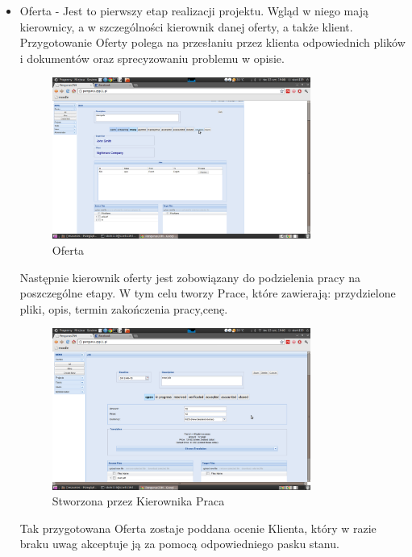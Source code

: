 \documentclass[licencjacka]{pracamgr}
\begin{document}
\begin{itemize}
\item Oferta - Jest to pierwszy etap realizacji projektu. Wgląd w niego mają kierownicy, a w szczególności kierownik danej oferty, a także klient.
Przygotowanie Oferty polega na przesłaniu przez klienta odpowiednich plików i dokumentów oraz sprecyzowaniu problemu w opisie.

\begin{figure}[ht!]
\centering
\includegraphics[width=0.8\textwidth]{resources/quote.png}
\caption{Oferta}
\end{figure}

Następnie kierownik oferty jest zobowiązany do podzielenia pracy na poszczególne etapy. W tym celu tworzy Prace, które zawierają:
przydzielone pliki, opis, termin zakończenia pracy,cenę.

\begin{figure}[ht!]
\centering
\includegraphics[width=0.8\textwidth]{resources/job.png}
\caption{Stworzona przez Kierownika Praca}
\end{figure}

Tak przygotowana Oferta zostaje poddana ocenie Klienta, który w razie braku uwag akceptuje ją za pomocą odpowiedniego pasku stanu.


\end{itemize}
\end{document}
